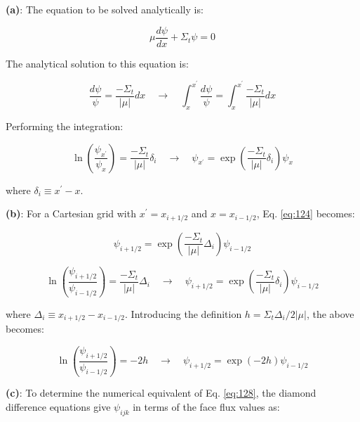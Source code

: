 \documentclass[10pt]{article}
\begin{document}
\textbf{(a)}: The equation to be solved analytically is:

\begin{equation}
\label{eq:Ex2}
\mu\frac{d\psi}{dx}+\Sigma_t\psi=0
\end{equation}

The analytical solution to this equation is:

\begin{equation}
\frac{d\psi}{\psi}=\frac{-\Sigma_t}{|\mu|}dx\quad\rightarrow\quad\int_{x}^{x^{'}}\frac{d\psi}{\psi}=\int_{x}^{x^{'}}\frac{-\Sigma_t}{|\mu|}dx
\end{equation}

Performing the integration:

\begin{equation}
\label{eq:124}
\ln{\left(\frac{\psi_{x^{'}}}{\psi_{x}}\right)}=\frac{-\Sigma_t}{|\mu|}\delta_i\quad\rightarrow\quad\psi_{x^{'}}=\exp{\left(\frac{-\Sigma_t}{|\mu|}\delta_i\right)}\psi_{x}
\end{equation}

where \(\delta_i\equiv x^{'}-x\).\newline

\textbf{(b)}: For a Cartesian grid with \(x^{'}=x_{i+1/2}\) and \(x=x_{i-1/2}\), Eq. \eqref{eq:124} becomes:

\begin{equation}
\label{eq:128}
\psi_{i+1/2}=\exp{\left(\frac{-\Sigma_t}{|\mu|}\Delta_i\right)}\psi_{i-1/2}
\end{equation}

\begin{equation}
\label{eq:1241}
\ln{\left(\frac{\psi_{i+1/2}}{\psi_{i-1/2}}\right)}=\frac{-\Sigma_t}{|\mu|}\Delta_i\quad\rightarrow\quad\psi_{i+1/2}=\exp{\left(\frac{-\Sigma_t}{|\mu|}\delta_i\right)}\psi_{i-1/2}
\end{equation}

where \(\Delta_i\equiv x_{i+1/2}-x_{i-1/2}\). Introducing the definition \(h=\Sigma_t\Delta_i/2|\mu|\), the above becomes:

\begin{equation}
\label{eq:128}
\ln{\left(\frac{\psi_{i+1/2}}{\psi_{i-1/2}}\right)}=-2h\quad\rightarrow\quad\psi_{i+1/2}=\exp{\left(-2h\right)}\psi_{i-1/2}
\end{equation}

\textbf{(c)}: To determine the numerical equivalent of Eq. \eqref{eq:128}, the diamond difference equations give \(\psi_{ijk}\) in terms of the face flux values as:
\end{document}
